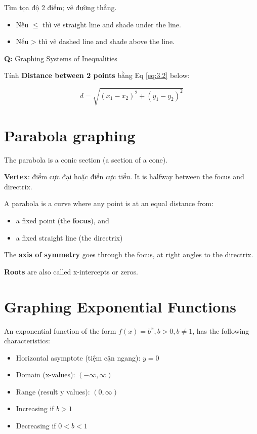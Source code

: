 Tìm tọa độ 2 điểm; vẽ đường thẳng.

\begin{itemize}
  \item Nếu \(\le\) thì vẽ straight line and shade under the line.
  \item Nếu > thì vẽ dashed line and shade above the line.
\end{itemize}

\textbf{Q: }Graphing Systems of Inequalities

\vspace{5mm}

Tính \textbf{Distance between 2 points} bằng Eq \ref{eq:3.2} below:

\begin{equation}
  d = \sqrt{(x_{1}-x_{2})^{2} + (y_{1}-y_{2})^{2}}
  \label{eq:3.2}
\end{equation}

\vspace{5mm}

\section{Parabola graphing}

The parabola is a conic section (a section of a cone).

\textbf{Vertex}: điểm cực đại hoặc điển cực tiểu. It is halfway between the focus and directrix.

A parabola is a curve where any point is at an equal distance from:
\begin{itemize}
	\item a fixed point (the \textbf{focus}), and
    \item a fixed straight line (the directrix)
\end{itemize}

The \textbf{axis of symmetry} goes through the focus, at right angles to the directrix.

\textbf{Roots} are also called x-intercepts or zeros.

\section{Graphing Exponential Functions}

An exponential function of the form \(f(x) = b^{x}, b > 0, b \neq 1\), has the following characteristics:

\begin{itemize}
  \item Horizontal asymptote (tiệm cận ngang): \(y=0\)
  \item Domain (x-values): \((-\infty, \infty)\)
  \item Range (result y values): \((0, \infty)\)
  \item Increasing if \(b>1\)
  \item Decreasing if \(0<b<1\)
\end{itemize}

